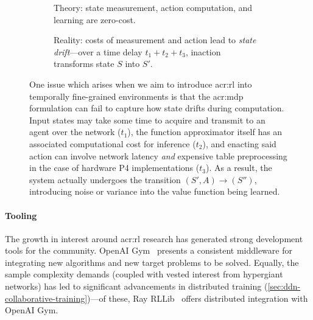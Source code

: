 \begin{figure}
	\begin{subfigure}{0.45\linewidth}
		\centering
		\resizebox{0.975\linewidth}{!}{}
		\caption{Theory: state measurement, action computation, and learning are zero-cost.}
	\end{subfigure}
	\hspace{0.05\linewidth}
	\begin{subfigure}{0.45\linewidth}
		\centering
		\resizebox{0.75\linewidth}{!}{}
		\caption{Reality: costs of measurement and action lead to \emph{state drift}---over a time delay $t_1+t_2+t_3$, inaction transforms state $S$ into $S'$.}
	\end{subfigure}
	\caption[Illustrating state slippage in an asynchronous RL agent.]{One issue which arises when we aim to introduce \gls{acr:rl} into temporally fine-grained environments is that the \gls{acr:mdp} formulation can fail to capture how state drifts during computation. Input states may take some time to acquire and transmit to an agent over the network ($t_1$), the function approximator itself has an associated computational cost for inference ($t_2$), and enacting said action can involve network latency \emph{and} expensive table preprocessing in the case of hardware P4 implementations ($t_3$). As a result, the system actually undergoes the transition $(S', A)\rightarrow(S'')$, introducing noise or variance into the value function being learned. \label{fig:state-slip}}
\end{figure}

\paragraph{Tooling}
The growth in interest around \gls{acr:rl} research has generated strong development tools for the community.
OpenAI Gym~\parencite{DBLP:journals/corr/BrockmanCPSSTZ16} presents a consistent middleware for integrating new algorithms and new target problems to be solved.
Equally, the sample complexity demands (coupled with vested interest from hypergiant networks) has led to significant advancements in distributed training (\cref{sec:ddn-collaborative-training})---of these, Ray RLLib~\parencite{DBLP:conf/osdi/MoritzNWTLLEYPJ18} offers distributed integration with OpenAI Gym.